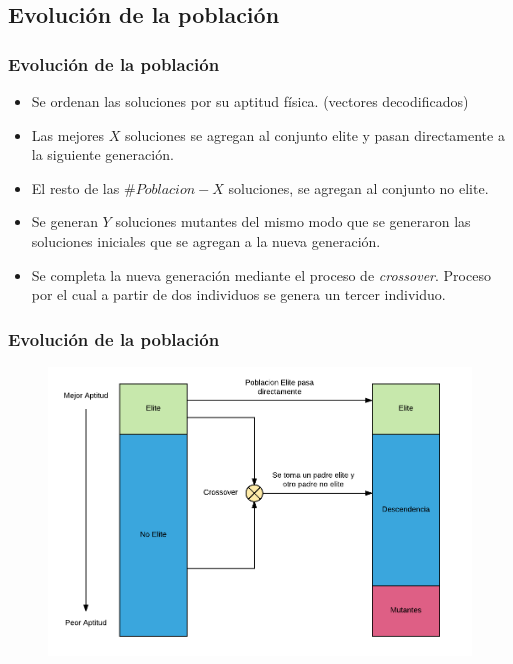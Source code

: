 \documentclass{beamer}
\begin{document}

\subsection{Evolución de la población}

\begin{frame}
\frametitle{Evolución de la población}

\begin{itemize}
    \item Se ordenan las soluciones por su aptitud física. (vectores decodificados)
    \pause
    \item Las mejores $X$ soluciones se agregan al conjunto elite y pasan directamente a la siguiente generación.
    \pause
    \item El resto de las $\#Poblacion-X$ soluciones, se agregan al conjunto no elite.
    \pause
    \item Se generan $Y$ soluciones mutantes del mismo modo que se generaron las soluciones iniciales que se agregan a la nueva generación.
    \pause
    \item Se completa la nueva generación mediante el proceso de \textit{crossover}. Proceso por el cual a partir de dos individuos se genera un tercer individuo.
\end{itemize}

\end{frame}


\begin{frame}
\frametitle{Evolución de la población}

\begin{figure}[h]
	\centering
	\includegraphics[width=12cm]{EvolucionPoblacion}
	\label{fig:EvolucionPoblacion}
\end{figure}

\end{frame}
\end{document}
